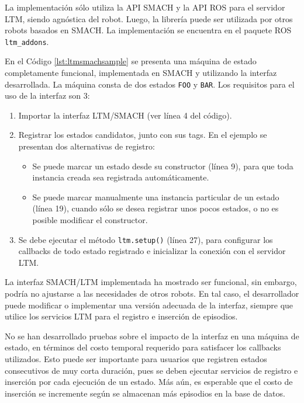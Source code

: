 La implementación sólo utiliza la API SMACH y la API ROS para el servidor LTM, siendo agnóstica del robot. Luego, la librería puede ser utilizada por otros robots basados en SMACH. La implementación se encuentra en el paquete ROS \texttt{ltm\_addons}.

 En el Código \ref{lst:ltmsmachsample} se presenta una máquina de estado completamente funcional, implementada en SMACH y utilizando la interfaz desarrollada. La máquina consta de dos estados \texttt{FOO} y \texttt{BAR}. Los requisitos para el uso de la interfaz son 3:
\begin{enumerate}
	\item Importar la interfaz LTM/SMACH (ver línea 4 del código).
	\item Registrar los estados candidatos, junto con sus tags. En el ejemplo se presentan dos alternativas de registro: 
	\begin{itemize}
		\item Se puede marcar un estado desde su constructor (línea 9), para que toda instancia creada sea registrada automáticamente.
		\item Se puede marcar manualmente una instancia particular de un estado (línea 19), cuando sólo se desea registrar unos pocos estados, o no es posible modificar el constructor.
	\end{itemize}
	\item Se debe ejecutar el método \texttt{ltm.setup()} (línea 27), para configurar los callbacks de todo estado registrado e inicializar la conexión con el servidor LTM.
\end{enumerate}
\lstset{language=Python}


 La interfaz SMACH/LTM implementada ha mostrado ser funcional, sin embargo, podría no ajustarse a las necesidades de otros robots. En tal caso, el desarrollador puede modificar o implementar una versión adecuada de la interfaz, siempre que utilice los servicios LTM para el registro e inserción de episodios.

 No se han desarrollado pruebas sobre el impacto de la interfaz en una máquina de estado, en términos del costo temporal requerido para satisfacer los callbacks utilizados. Esto puede ser importante para usuarios que registren estados consecutivos de muy corta duración, pues se deben ejecutar servicios de registro e inserción por cada ejecución de un estado. Más aún, es esperable que el costo de inserción se incremente según se almacenan más episodios en la base de datos.


